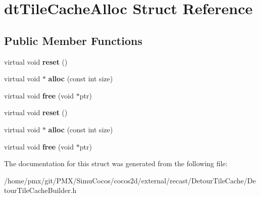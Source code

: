 \hypertarget{structdtTileCacheAlloc}{}\section{dt\+Tile\+Cache\+Alloc Struct Reference}
\label{structdtTileCacheAlloc}
\subsection*{Public Member Functions}
\begin{DoxyCompactItemize}
\item 
\mbox{\label{structdtTileCacheAlloc_a04f61863b2c6a81e1fbfd96dd519a733}} 
virtual void {\bfseries reset} ()
\item 
\mbox{\label{structdtTileCacheAlloc_acc233b107e42a5dcec56093dd1d29741}} 
virtual void $\ast$ {\bfseries alloc} (const int size)
\item 
\mbox{\label{structdtTileCacheAlloc_aeb9afcb80b4e923d173b2c1706c56130}} 
virtual void {\bfseries free} (void $\ast$ptr)
\item 
\mbox{\label{structdtTileCacheAlloc_a04f61863b2c6a81e1fbfd96dd519a733}} 
virtual void {\bfseries reset} ()
\item 
\mbox{\label{structdtTileCacheAlloc_acc233b107e42a5dcec56093dd1d29741}} 
virtual void $\ast$ {\bfseries alloc} (const int size)
\item 
\mbox{\label{structdtTileCacheAlloc_aeb9afcb80b4e923d173b2c1706c56130}} 
virtual void {\bfseries free} (void $\ast$ptr)
\end{DoxyCompactItemize}


The documentation for this struct was generated from the following file\+:\begin{DoxyCompactItemize}
\item 
/home/pmx/git/\+P\+M\+X/\+Simu\+Cocos/cocos2d/external/recast/\+Detour\+Tile\+Cache/Detour\+Tile\+Cache\+Builder.\+h\end{DoxyCompactItemize}
